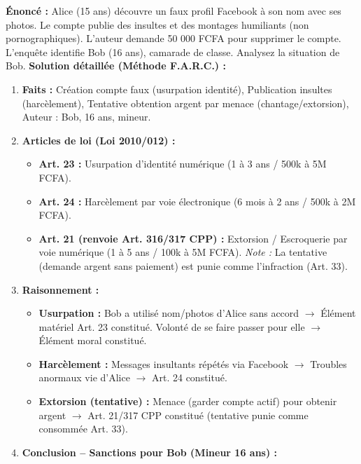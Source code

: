 \documentclass[11pt]{article}
\begin{document}
\begin{exoresolu}
    \textbf{Énoncé :} Alice (15 ans) découvre un faux profil Facebook à son nom avec ses photos. Le compte publie des insultes et des montages humiliants (non pornographiques). L'auteur demande 50 000 FCFA pour supprimer le compte. L'enquête identifie Bob (16 ans), camarade de classe. Analysez la situation de Bob.
    \tcblower
    \textbf{Solution détaillée (Méthode F.A.R.C.) :}
    \begin{enumerate}
        \item \textbf{Faits :} Création compte faux (usurpation identité), Publication insultes (harcèlement), Tentative obtention argent par menace (chantage/extorsion), Auteur : Bob, 16 ans, mineur.
        \item \textbf{Articles de loi (Loi 2010/012) :}
              \begin{itemize}
                  \item \textbf{Art. 23 :} Usurpation d'identité numérique (1 à 3 ans / 500k à 5M FCFA).
                  \item \textbf{Art. 24 :} Harcèlement par voie électronique (6 mois à 2 ans / 500k à 2M FCFA).
                  \item \textbf{Art. 21 (renvoie Art. 316/317 CPP) :} Extorsion / Escroquerie par voie numérique (1 à 5 ans / 100k à 5M FCFA). \textit{Note :} La tentative (demande argent sans paiement) est punie comme l'infraction (Art. 33).
              \end{itemize}
        \item \textbf{Raisonnement :}
              \begin{itemize}
                  \item \textbf{Usurpation :} Bob a utilisé nom/photos d'Alice sans accord $\rightarrow$ Élément matériel Art. 23 constitué. Volonté de se faire passer pour elle $\rightarrow$ Élément moral constitué.
                  \item \textbf{Harcèlement :} Messages insultants répétés via Facebook $\rightarrow$ Troubles anormaux vie d'Alice $\rightarrow$ Art. 24 constitué.
                  \item \textbf{Extorsion (tentative) :} Menace (garder compte actif) pour obtenir argent $\rightarrow$ Art. 21/317 CPP constitué (tentative punie comme consommée Art. 33).
              \end{itemize}
        \item \textbf{Conclusion -- Sanctions pour Bob (Mineur 16 ans) :}

\end{enumerate}
\end{exoresolu}
\end{document}
